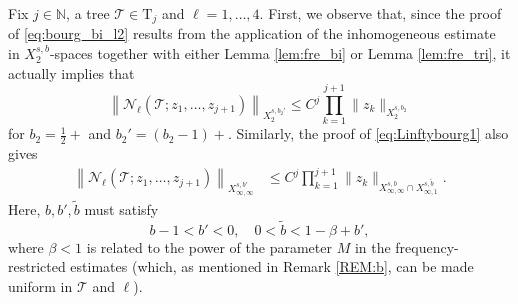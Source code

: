 \documentclass[%
11pt,  reqno]{amsart}
\newcommand{\5}{\textup{V}}
\theoremstyle{remark}
\newcommand{\TT}{\mathcal{T}}
\newcommand{\Tr}{\mathrm{T}}
\renewcommand{\l}{\ell}
\newcommand{\N}{\mathbb{N}}
\numberwithin{equation}{section}
\numberwithin{theorem}{section}
\newcommand{\Ncal}{\mathcal{N}}
\begin{document}
Fix $j\in\N$, a tree $\TT\in \Tr_j$ and $\ell=1,\dots,4$. First, we observe that, since the proof of \eqref{eq:bourg_bi_l2} results from the application of the inhomogeneous estimate in $X_2^{s,b}$-spaces together with either Lemma \ref{lem:fre_bi} or Lemma \ref{lem:fre_tri}, it actually implies that 
\begin{equation}\label{eq:L2_interp}
		\left\| \Ncal_\l(\TT; z_1,\dots, z_{j+1})\right\|_{X^{s,b_2'}_{2}}  \le  C^j\prod_{k=1}^{j+1}\|z_k\|_{X^{s,b_2}_{2}}
\end{equation}
for $b_2=\frac12 +$ and $b_2'=(b_2-1)+$. Similarly, the proof of \eqref{eq:Linftybourg1} also gives 
\begin{align*}
    \left\| \Ncal_\l(\TT; z_1,\dots, z_{j+1})\right\|_{X^{s,b'}_{\infty, \infty}} &\le  C^j\prod_{k=1}^{j+1}\|z_k\|_{X^{s,b}_{\infty, \infty}\cap X^{s,\tilde{b}}_{\infty,1}}.
\end{align*}
Here, $b, b', \tilde{b}$ must satisfy
\begin{equation}\label{eq:cond_lp}
    b-1<b'<0, \quad 0<\tilde{b}<1-\beta + b',
\end{equation}
where $\beta<1$ is related to the power of the parameter $M$ in the frequency-restricted estimates (which, as mentioned in Remark \ref{REM:b}, can be made uniform in $\TT$ and $\l$).
\end{document}
